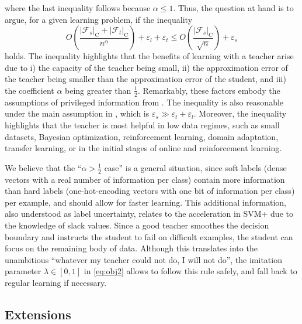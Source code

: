 \documentclass{article}
\begin{document}
where the last inequality follows because $\alpha \leq 1$. Thus, the question
at hand is to argue, for a given learning problem, if the inequality
\begin{equation*}
  O\left(\frac{|\mathcal{F}_s|_\textrm{C} +
  |\mathcal{F}_t|_\textrm{C}}{n^{\alpha}}\right) + \varepsilon_l +
  \varepsilon_t \leq O\left(\frac{|\mathcal{F}_s|_\textrm{C}}{\sqrt{n}}\right)
  + \varepsilon_s
\end{equation*}
holds.  The inequality highlights that the benefits of learning with a teacher
arise due to i) the capacity of the teacher being small, ii) the approximation
error of the teacher being smaller than the approximation error of the student,
and iii) the coefficient $\alpha$ being greater than $\frac{1}{2}$.
Remarkably, these factors embody the assumptions of privileged information from
\citet{VapIzm15}. The inequality is also reasonable under the main assumption
in \citep{Hinton15}, which is $\varepsilon_s \gg \varepsilon_t +
\varepsilon_l$.  Moreover, the inequality highlights that the teacher is most
helpful in low data regimes, such as small datasets, Bayesian optimization,
reinforcement learning, domain adaptation, transfer learning, or in the initial
stages of online and reinforcement learning.

We believe that the ``$\alpha > \frac{1}{2}$ case'' is a general situation,
since soft labels (dense vectors with a real number of information per class)
contain more information than hard labels (one-hot-encoding vectors with one
bit of information per class) per example, and should allow for faster
learning. This additional information, also understood as label uncertainty, 
relates to the acceleration in SVM+ due to the knowledge of slack values. Since a
good teacher smoothes the decision boundary and instructs the student to fail
on difficult examples, the student can focus on the remaining body of data.
Although this translates into the unambitious ``whatever my
teacher could not do, I will not do'', the imitation parameter $\lambda \in [0,1]$
in \eqref{eq:obj2} allows to follow this rule safely, and fall back to regular
learning if necessary.

\subsection{Extensions}
\end{document}
